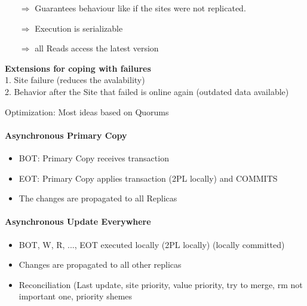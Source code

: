 \documentclass[a4paper,12pt]{article}%
\begin{document}
 
 
 \begin{itemize}
  \item[$\Rightarrow$] Guarantees behaviour like if the sites were not replicated.
  \item[$\Rightarrow$]  Execution is serializable
  \item[$\Rightarrow$]  all Reads access the latest version
 \end{itemize}

 {\bf Extensions for coping with failures} \\
 1. Site failure (reduces the avalability) \\
 2. Behavior after the Site that failed is online again (outdated data available)
 
 
 
 Optimization: Most ideas based on Quorums
 
 
 \paragraph{Asynchronous Primary Copy}
 \begin{itemize}
  \item BOT: Primary Copy receives transaction
  \item EOT: Primary Copy applies transaction (2PL locally) and COMMITS
  \item The changes are propagated to all Replicas
 \end{itemize}

 
 
 \paragraph{Asynchronous Update Everywhere}
 \begin{itemize}
  \item BOT, W, R, ..., EOT executed locally (2PL locally) (locally committed) 
  \item Changes are propagated to all other replicas
  \item Reconciliation (Last update, site priority, value priority, try to merge, rm not important one, priority shemes
 \end{itemize}

 
 
 
 
 
 
 
 
 
 
 
 
\end{document}
